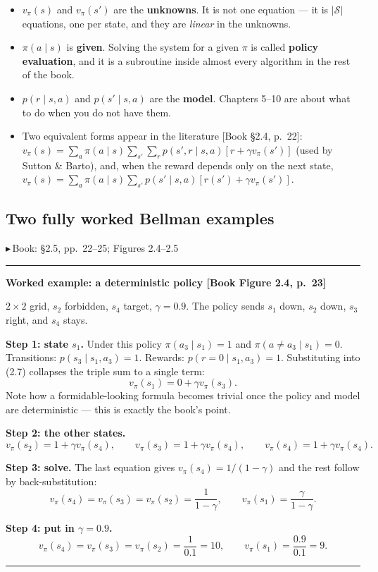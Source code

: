\documentclass[11pt, letterpaper]{article}
\theoremstyle{runin}
\theoremstyle{runinplain}
\theoremstyle{remark}
\newcommand{\Sspace}{\mathcal{S}}
\newcommand{\bk}[1]{{\color{bookblue}\small$\blacktriangleright$\,\textsf{Book: #1}}}
\newcommand{\bkin}[1]{{\color{bookblue}\small[\textsf{Book #1}]}}
\newenvironment{worked}[1]
  {\par\medskip\noindent\rule{\textwidth}{0.4pt}\par\nobreak\vspace{0.3em}
   \noindent\textbf{Worked example: #1}\par\nobreak\vspace{0.2em}\small}
  {\par\nobreak\vspace{0.3em}\noindent\rule{\textwidth}{0.4pt}\par\medskip}
\begin{document}
\begin{itemize}
  \item $v_\pi(s)$ and $v_\pi(s')$ are the \textbf{unknowns}. It is not one
        equation --- it is $|\Sspace|$ equations, one per state, and they are
        \emph{linear} in the unknowns.
  \item $\pi(a\mid s)$ is \textbf{given}. Solving the system for a given $\pi$ is
        called \textbf{policy evaluation}, and it is a subroutine inside almost
        every algorithm in the rest of the book.
  \item $p(r\mid s,a)$ and $p(s'\mid s,a)$ are the \textbf{model}. Chapters 5--10
        are about what to do when you do not have them.
  \item Two equivalent forms appear in the literature \bkin{\S2.4, p.~22}:
        $v_\pi(s)=\sum_a\pi(a\mid s)\sum_{s'}\sum_r p(s',r\mid s,a)[r+\gamma v_\pi(s')]$
        (used by Sutton \& Barto), and, when the reward depends only on the next
        state, $v_\pi(s)=\sum_a\pi(a\mid s)\sum_{s'}p(s'\mid s,a)[r(s')+\gamma v_\pi(s')]$.
\end{itemize}

\subsection{Two fully worked Bellman examples}

\bk{\S2.5, pp.~22--25; Figures 2.4--2.5}

\begin{worked}{a deterministic policy \bkin{Figure 2.4, p.~23}}
$2\times2$ grid, $s_2$ forbidden, $s_4$ target, $\gamma=0.9$. The policy sends
$s_1$ down, $s_2$ down, $s_3$ right, and $s_4$ stays.

\textbf{Step 1: state $s_1$.} Under this policy $\pi(a_3\mid s_1)=1$ and
$\pi(a\neq a_3\mid s_1)=0$. Transitions: $p(s_3\mid s_1,a_3)=1$. Rewards:
$p(r=0\mid s_1,a_3)=1$. Substituting into (2.7) collapses the triple sum to a
single term:
\[
  v_\pi(s_1)=0+\gamma v_\pi(s_3).
\]
Note how a formidable-looking formula becomes trivial once the policy and model are
deterministic --- this is exactly the book's point.

\textbf{Step 2: the other states.}
\[
  v_\pi(s_2)=1+\gamma v_\pi(s_4),\qquad
  v_\pi(s_3)=1+\gamma v_\pi(s_4),\qquad
  v_\pi(s_4)=1+\gamma v_\pi(s_4).
\]

\textbf{Step 3: solve.} The last equation gives $v_\pi(s_4)=1/(1-\gamma)$ and the
rest follow by back-substitution:
\[
  v_\pi(s_4)=v_\pi(s_3)=v_\pi(s_2)=\frac{1}{1-\gamma},
  \qquad v_\pi(s_1)=\frac{\gamma}{1-\gamma}.
\]

\textbf{Step 4: put in $\gamma=0.9$.}
\[
  v_\pi(s_4)=v_\pi(s_3)=v_\pi(s_2)=\frac{1}{0.1}=10,
  \qquad v_\pi(s_1)=\frac{0.9}{0.1}=9.
\]
\end{worked}
\end{document}
